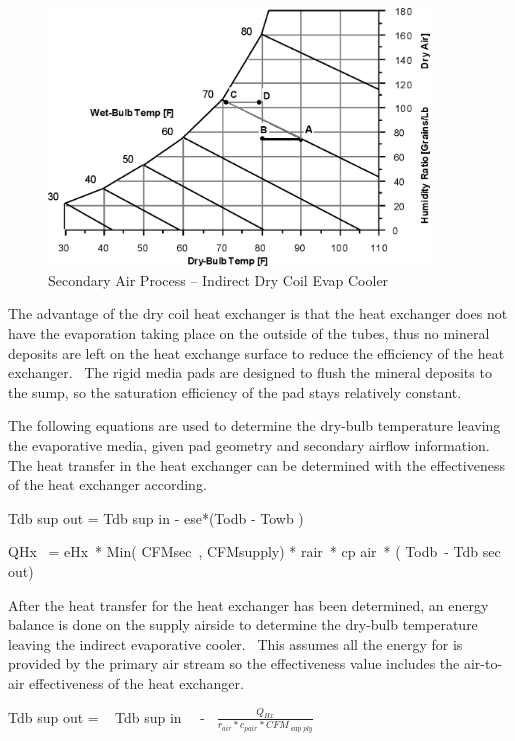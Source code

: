 \begin{figure}[hbtp] %
\centering
\includegraphics[width=0.9\textwidth, height=0.9\textheight, keepaspectratio=true]{media/image4795.png}
\caption{Secondary Air Process -- Indirect Dry Coil Evap Cooler \protect \label{fig:secondary-air-process-indirect-dry-coil-evap}}
\end{figure}

The advantage of the dry coil heat exchanger is that the heat exchanger does not have the evaporation taking place on the outside of the tubes, thus no mineral deposits are left on the heat exchange surface to reduce the efficiency of the heat exchanger.~ The rigid media pads are designed to flush the mineral deposits to the sump, so the saturation efficiency of the pad stays relatively constant.

The following equations are used to determine the dry-bulb temperature leaving the evaporative media, given pad geometry and secondary airflow information.~ The heat transfer in the heat exchanger can be determined with the effectiveness of the heat exchanger according.

Tdb sup out = Tdb sup in - ese*(Todb - Towb )

QHx~ = eHx~* Min( CFMsec~, CFMsupply) * rair~* cp air~* ( Todb~- Tdb sec out)

After the heat transfer for the heat exchanger has been determined, an energy balance is done on the supply airside to determine the dry-bulb temperature leaving the indirect evaporative cooler. ~This assumes all the energy for is provided by the primary air stream so the effectiveness value includes the air-to-air effectiveness of the heat exchanger.

Tdb sup out = ~ Tdb sup in~~ -~ \(\frac{{{Q_{Hx}}}}{{{r_{air}}*{c_{pair}}*CF{M_{\sup ply}}}}\)

